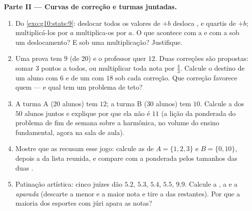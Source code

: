 \begin{problem}
\medskip
\noindent\textbf{Parte II --- Curvas de correção e turmas
juntadas.}
\begin{enumerate}[resume]
  \item Do \cref{exo:g10:stats:9}: deslocar todos os valores de
        $+b$ desloca ,  e quartis de $+b$;
        multiplicá-los por $a$ multiplica-os por $a$. O que
        acontece com a  e com a 
        sob um deslocamento? E sob uma multiplicação? Justifique.
  \item Uma prova tem  $9$ (de $20$) e o professor quer
         $12$. Duas correções são propostas: somar $3$
        pontos a todos, ou multiplicar toda nota por $\frac43$.
        Calcule o destino de um aluno com $6$ e de um com $18$
        sob cada correção. Que correção favorece quem --- e qual
        tem um problema de teto?
  \item A turma A ($20$ alunos) tem  $12$; a turma B ($30$
        alunos) tem  $10$. Calcule a  dos $50$ alunos
        juntos e explique por que ela não é $11$ (a lição da
         ponderada do problema de fim de semana sobre a
         harmônica, no volume do ensino fundamental, agora
        na sala de aula).
  \item Mostre que as  recusam esse jogo: calcule as
         de $A = \{1, 2, 3\}$ e $B = \{0, 10\}$, depois a
         da lista reunida, e compare com a 
        ponderada pelos tamanhos das duas .
  \item Patinação artística: cinco juízes dão $5.2$, $5.3$,
        $5.4$, $5.5$, $9.9$. Calcule a , a  e a
        \emph{ aparada} (descarte a menor e a maior nota e
        tire a  das restantes). Por que a maioria dos
        esportes com júri apara as notas?
\end{enumerate}


\end{problem}

